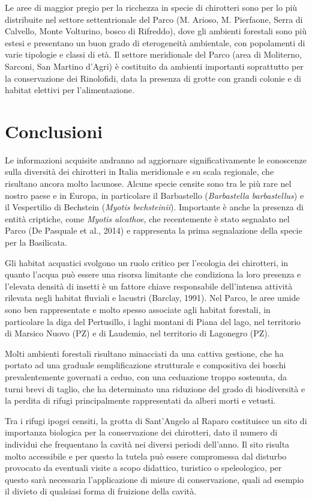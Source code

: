 \begin{multicols}{2}
Le aree di maggior pregio per la ricchezza in specie di chirotteri sono per lo più distribuite nel settore settentrionale del Parco (M. Arioso, M. Pierfaone, Serra di Calvello, Monte Volturino, bosco di Rifreddo), dove gli ambienti forestali sono più estesi e presentano un buon grado di eterogeneità ambientale, con popolamenti di varie tipologie e classi di età. Il settore meridionale del Parco (area di Moliterno, Sarconi, San Martino d’Agri) è costituito da ambienti importanti soprattutto per la conservazione dei Rinolofidi, data la presenza di grotte con grandi colonie e di habitat elettivi per l’alimentazione. 

\section*{Conclusioni}
Le informazioni acquisite andranno ad aggiornare significativamente le conoscenze sulla diversità dei chirotteri in Italia meridionale e su scala regionale, che risultano ancora molto lacunose. Alcune specie censite sono tra le più rare nel nostro paese e in Europa, in particolare il Barbastello (\emph{Barbastella barbastellus}) e il Vespertilio di Bechstein (\emph{Myotis bechsteinii}). Importante è anche la presenza di entità criptiche, come \emph{Myotis alcathoe}, che recentemente è stato segnalato nel Parco (De Pasquale et al., 2014) e rappresenta la prima segnalazione della specie per la Basilicata. 

Gli habitat acquatici svolgono un ruolo critico per l’ecologia dei chirotteri, in quanto l’acqua può essere una risorsa limitante che condiziona la loro presenza e l’elevata densità di insetti è un fattore chiave responsabile dell’intensa attività rilevata negli habitat fluviali e lacustri (Barclay, 1991). Nel Parco, le aree umide sono ben rappresentate e molto spesso associate agli habitat forestali, in particolare la diga del Pertusillo, i laghi montani di Piana del lago, nel territorio di Marsico Nuovo (PZ) e di Laudemio, nel territorio di Lagonegro (PZ). 

Molti ambienti forestali risultano minacciati da una cattiva gestione, che ha portato ad una graduale semplificazione strutturale e compositiva dei boschi prevalentemente governati a ceduo, con una ceduazione troppo sostenuta, da turni brevi di taglio, che ha determinato una riduzione del grado di biodiversità e la perdita di rifugi principalmente rappresentati da alberi morti e vetusti.   

Tra i rifugi ipogei censiti, la grotta di Sant’Angelo al Raparo costituisce un sito di importanza biologica per la conservazione dei chirotteri, dato il numero di individui che frequentano la cavità nei diversi periodi dell’anno. Il sito risulta molto accessibile e per questo la tutela può essere compromessa dal disturbo provocato da eventuali visite a scopo didattico, turistico o speleologico, per questo sarà necessaria l’applicazione di misure di conservazione, quali ad esempio il divieto di qualsiasi forma di fruizione della cavità. 


\end{multicols}
